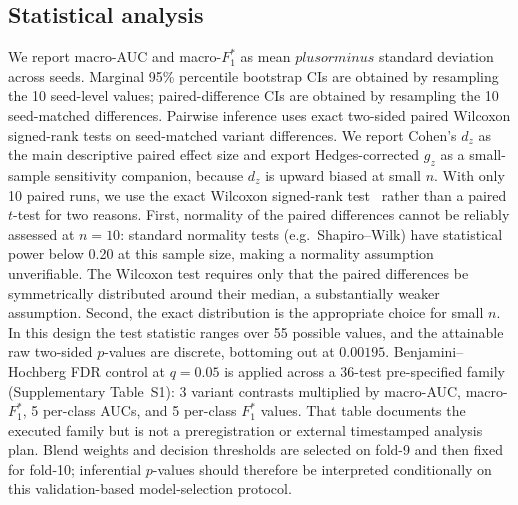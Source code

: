 \documentclass[mathematics,article,submit,pdftex]{Definitions/mdpi}
\def\mathrm#1{#1}%
\def\pm{plus or minus }%
\begin{document}
\subsection{Statistical analysis}
We report macro-AUC and macro-$F_1^{\ast}$ as mean $\pm$ standard deviation across seeds. Marginal 95\% percentile bootstrap CIs are obtained by resampling the 10 seed-level values; paired-difference CIs are obtained by resampling the 10 seed-matched differences. Pairwise inference uses exact two-sided paired Wilcoxon signed-rank tests on seed-matched variant differences. We report Cohen's $d_{\mathrm{z}}$ as the main descriptive paired effect size and export Hedges-corrected $g_{\mathrm{z}}$ as a small-sample sensitivity companion, because $d_{\mathrm{z}}$ is upward biased at small $n$. With only 10 paired runs, we use the exact Wilcoxon signed-rank test~\cite{Hollander2014} rather than a paired $t$-test for two reasons. First, normality of the paired differences cannot be reliably assessed at $n{=}10$: standard normality tests (e.g.\ Shapiro--Wilk) have statistical power below 0.20 at this sample size, making a normality assumption unverifiable. The Wilcoxon test requires only that the paired differences be symmetrically distributed around their median, a substantially weaker assumption. Second, the exact distribution is the appropriate choice for small $n$. In this design the test statistic ranges over 55 possible values, and the attainable raw two-sided $p$-values are discrete, bottoming out at $0.00195$. Benjamini--Hochberg FDR control at $q{=}0.05$ is applied across a 36-test pre-specified family (Supplementary Table~S1): 3 variant contrasts multiplied by macro-AUC, macro-$F_1^{\ast}$, 5 per-class AUCs, and 5 per-class $F_1^{\ast}$ values. That table documents the executed family but is not a preregistration or external timestamped analysis plan. Blend weights and decision thresholds are selected on fold-9 and then fixed for fold-10; inferential $p$-values should therefore be interpreted conditionally on this validation-based model-selection protocol.
\end{document}
